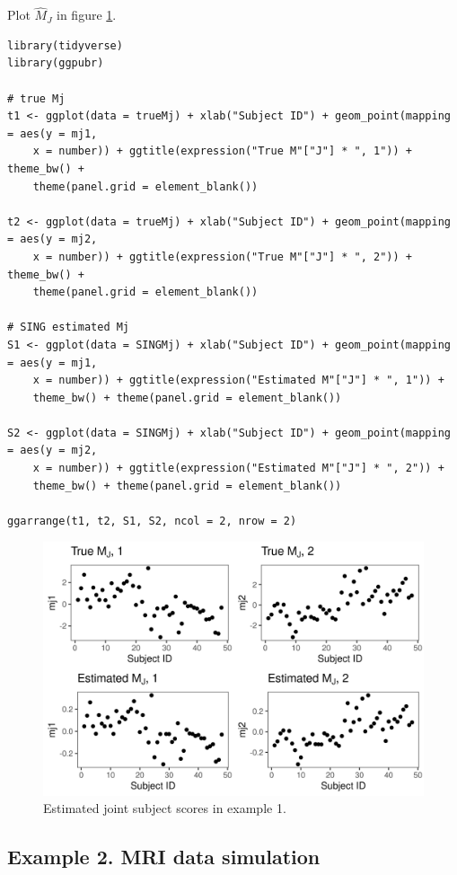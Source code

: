 Plot \(\widehat{M}_J\) in figure \ref{fig:mjex1}.

\begin{verbatim}
library(tidyverse)
library(ggpubr)

# true Mj
t1 <- ggplot(data = trueMj) + xlab("Subject ID") + geom_point(mapping = aes(y = mj1,
    x = number)) + ggtitle(expression("True M"["J"] * ", 1")) + theme_bw() +
    theme(panel.grid = element_blank())

t2 <- ggplot(data = trueMj) + xlab("Subject ID") + geom_point(mapping = aes(y = mj2,
    x = number)) + ggtitle(expression("True M"["J"] * ", 2")) + theme_bw() +
    theme(panel.grid = element_blank())

# SING estimated Mj
S1 <- ggplot(data = SINGMj) + xlab("Subject ID") + geom_point(mapping = aes(y = mj1,
    x = number)) + ggtitle(expression("Estimated M"["J"] * ", 1")) +
    theme_bw() + theme(panel.grid = element_blank())

S2 <- ggplot(data = SINGMj) + xlab("Subject ID") + geom_point(mapping = aes(y = mj2,
    x = number)) + ggtitle(expression("Estimated M"["J"] * ", 2")) +
    theme_bw() + theme(panel.grid = element_blank())

ggarrange(t1, t2, S1, S2, ncol = 2, nrow = 2)
\end{verbatim}

\begin{figure}
\includegraphics[width=1\linewidth]{figures/MJ} \caption{Estimated joint subject scores in example 1.}\label{fig:mjex1}
\end{figure}

\hypertarget{example-2.-mri-data-simulation}{%
\subsection{Example 2. MRI data simulation}\label{example-2.-mri-data-simulation}}

